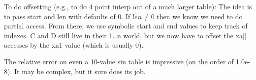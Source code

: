 To do offsetting (e.g., to do 4 point interp out of a much
larger table): The idea is to pass start and len with
defaults of 0.  If $len \ne 0$ then we know we need to do
partial access.  From there, we use symbolic start and end
values to keep track of indexes. C and D still live in their
1\dots n world, but we now have to offset the xa[] accesses by
the xn1 value (which is usually 0).

The relative error on even a 10-value sin table is
impressive (on the order of 1.0e-8).  It may be complex, but
it sure does its job.
